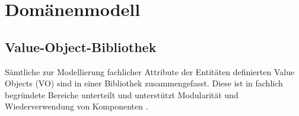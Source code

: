 


\section{Domänenmodell}
\subsection{Value-Object-Bibliothek}
Sämtliche zur Modellierung fachlicher Attribute der Entitäten definierten Value Objects (VO) sind in einer Bibliothek zusammengefasst. Diese ist in fachlich begründete Bereiche unterteilt und unterstützt Modularität und Wiederverwendung von Komponenten \citep[S.120]{Vernon2016}. 

